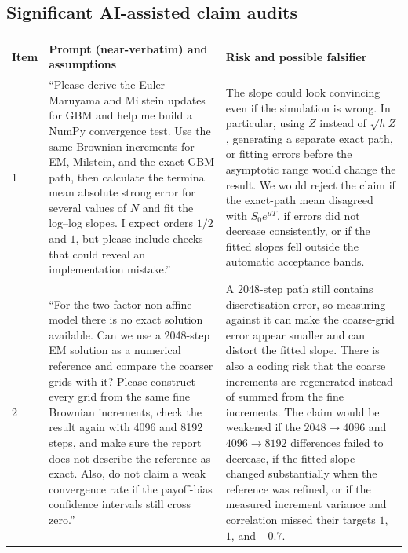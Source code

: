 \documentclass[11pt,a4paper]{article}
\theoremstyle{definition}
\theoremstyle{remark}
\begin{document}
\subsection{Significant AI-assisted claim audits}

\begingroup
\scriptsize
\setlength{\tabcolsep}{4pt}
\renewcommand{\arraystretch}{1.15}

\begin{tabular}{|p{}|p{}|p{}|}
\hline
\textbf{Item} &
\textbf{Prompt (near-verbatim) and assumptions} &
\textbf{Risk and possible falsifier} \\
\hline

1 &
``Please derive the Euler--Maruyama and Milstein updates for GBM and help me build a NumPy convergence test. Use the same Brownian increments for EM, Milstein, and the exact GBM path, then calculate the terminal mean absolute strong error for several values of \(N\) and fit the log--log slopes. I expect orders \(1/2\) and \(1\), but please include checks that could reveal an implementation mistake.'' &
The slope could look convincing even if the simulation is wrong. In particular, using \(Z\) instead of \(\sqrt{h}Z\), generating a separate exact path, or fitting errors before the asymptotic range would change the result. We would reject the claim if the exact-path mean disagreed with \(S_0e^{\mu T}\), if errors did not decrease consistently, or if the fitted slopes fell outside the automatic acceptance bands. \\
\hline

2 &
``For the two-factor non-affine model there is no exact solution available. Can we use a 2048-step EM solution as a numerical reference and compare the coarser grids with it? Please construct every grid from the same fine Brownian increments, check the result again with 4096 and 8192 steps, and make sure the report does not describe the reference as exact. Also, do not claim a weak convergence rate if the payoff-bias confidence intervals still cross zero.'' &
A 2048-step path still contains discretisation error, so measuring against it can make the coarse-grid error appear smaller and can distort the fitted slope. There is also a coding risk that the coarse increments are regenerated instead of summed from the fine increments. The claim would be weakened if the \(2048\mathbin{\to}4096\) and \(4096\mathbin{\to}8192\) differences failed to decrease, if the fitted slope changed substantially when the reference was refined, or if the measured increment variance and correlation missed their targets \(1\), \(1\), and \(-0.7\). \\
\hline


\end{tabular}
\end{document}

